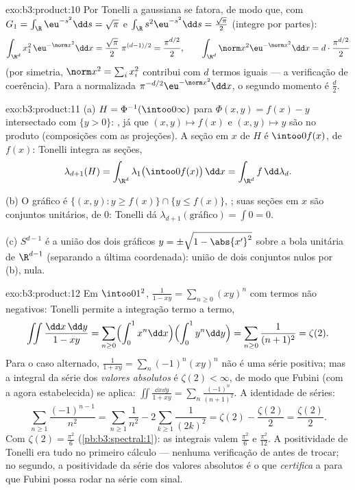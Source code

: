 \begin{solution}{exo:b3:product:10}
Por Tonelli a gaussiana se fatora, de modo que, com $G_1 =
\int_\R\eu^{-s^2}\dd s = \sqrt\pi$ e $\int_\R
s^2\eu^{-s^2}\dd s = \frac{\sqrt\pi}2$ (integre por partes):
\[
\int_{\R^d}x_1^2\,\eu^{-\norm x^2}\dd x =
\frac{\sqrt\pi}2\;\pi^{(d-1)/2} = \frac{\pi^{d/2}}2,
\qquad
\int_{\R^d}\norm x^2\eu^{-\norm x^2}\dd x =
d\cdot\frac{\pi^{d/2}}2
\]
(por simetria, $\norm x^2 = \sum_ix_i^2$ contribui com $d$ termos iguais
--- a verificação de coerência). Para a  normalizada
$\pi^{-d/2}\eu^{-\norm x^2}\dd x$, o segundo momento é
$\frac d2$.
\end{solution}

\begin{solution}{exo:b3:product:11}
(a) $H = \Phi^{-1}(\intoo0\infty)$ para $\Phi(x, y) = f(x) -
y$ intersectado com $\{y > 0\}$: , já que $(x, y)
\mapsto f(x)$ e $(x,y)\mapsto y$ são  no
produto (composições com as projeções). A
seção em $x$ de $H$ é $\intoo0{f(x)}$, de  $f(x)$:
Tonelli integra as seções,
\[
\lambda_{d+1}(H) = \int_{\R^d}\lambda_1\bigl(\intoo0{f(x)}
\bigr)\,\dd x = \int_{\R^d}f\,\dd\lambda_d .
\]

(b) O gráfico é $\{(x,y) : y \geq f(x)\} \cap \{y \leq
f(x)\}$, ; suas seções em $x$ são conjuntos unitários, de
 $0$: Tonelli dá $\lambda_{d+1}(\text{gráfico}) =
\int 0 = 0$.

(c) $S^{d-1}$ é a união dos dois gráficos $y =
\pm\sqrt{1 - \abs{x'}^2}$ sobre a bola unitária de $\R^{d-1}$
(separando a última coordenada): união de dois conjuntos nulos por
(b), nula.
\end{solution}

\begin{solution}{exo:b3:product:12}
Em $\intoo01^2$, $\frac1{1 - xy} = \sum_{n\geq0}(xy)^n$ com
termos não negativos: Tonelli permite a integração termo a termo,
\[
\iint\frac{\dd x\,\dd y}{1 - xy}
= \sum_{n\geq0}\Bigl(\int_0^1x^n\dd x\Bigr)
\Bigl(\int_0^1y^n\dd y\Bigr)
= \sum_{n\geq0}\frac1{(n+1)^2} = \zeta(2) .
\]
Para o caso alternado, $\frac1{1 + xy} =
\sum_n(-1)^n(xy)^n$ não é uma série positiva; mas a
integral da série dos \emph{valores absolutos} é $\zeta(2) <
\infty$, de modo que Fubini (com a  agora estabelecida) se aplica:
$\iint\frac{\dd x\dd y}{1 + xy} =
\sum_n\frac{(-1)^n}{(n+1)^2}$. A identidade de séries:
\[
\sum_{n\geq1}\frac{(-1)^{n-1}}{n^2}
= \sum_{n\geq1}\frac1{n^2} - 2\sum_{k\geq1}\frac1{(2k)^2}
= \zeta(2) - \frac{\zeta(2)}2 = \frac{\zeta(2)}2 .
\]
Com $\zeta(2) = \frac{\pi^2}6$ (\cref{pb:b3:spectral:1}):
as integrais valem $\frac{\pi^2}6$ e $\frac{\pi^2}{12}$.
A positividade de Tonelli era tudo no primeiro
cálculo --- nenhuma verificação de  antes de
trocar; no segundo, a positividade da série dos valores
absolutos é o que \emph{certifica} a  para que
Fubini possa rodar na série com sinal.
\end{solution}

